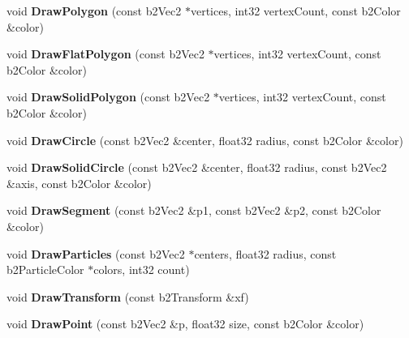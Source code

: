 \begin{DoxyCompactItemize}
\item 
\hypertarget{classDebugDraw_a14ab8cf80799e57df5414db216552962}{void {\bfseries Draw\-Polygon} (const b2\-Vec2 $\ast$vertices, int32 vertex\-Count, const b2\-Color \&color)}\label{classDebugDraw_a14ab8cf80799e57df5414db216552962}

\item 
\hypertarget{classDebugDraw_a8d576ff90e7d44b220b37c18c493e55c}{void {\bfseries Draw\-Flat\-Polygon} (const b2\-Vec2 $\ast$vertices, int32 vertex\-Count, const b2\-Color \&color)}\label{classDebugDraw_a8d576ff90e7d44b220b37c18c493e55c}

\item 
\hypertarget{classDebugDraw_a1562ce91df605efef3cdf300be267cc2}{void {\bfseries Draw\-Solid\-Polygon} (const b2\-Vec2 $\ast$vertices, int32 vertex\-Count, const b2\-Color \&color)}\label{classDebugDraw_a1562ce91df605efef3cdf300be267cc2}

\item 
\hypertarget{classDebugDraw_a5adb064981a67fefe7064820006b673e}{void {\bfseries Draw\-Circle} (const b2\-Vec2 \&center, float32 radius, const b2\-Color \&color)}\label{classDebugDraw_a5adb064981a67fefe7064820006b673e}

\item 
\hypertarget{classDebugDraw_a82428519034f36a01941dd19d6108bee}{void {\bfseries Draw\-Solid\-Circle} (const b2\-Vec2 \&center, float32 radius, const b2\-Vec2 \&axis, const b2\-Color \&color)}\label{classDebugDraw_a82428519034f36a01941dd19d6108bee}

\item 
\hypertarget{classDebugDraw_a69927caae41d26f23dea336a1269ee4e}{void {\bfseries Draw\-Segment} (const b2\-Vec2 \&p1, const b2\-Vec2 \&p2, const b2\-Color \&color)}\label{classDebugDraw_a69927caae41d26f23dea336a1269ee4e}

\item 
\hypertarget{classDebugDraw_a1a12644430a648a9a683eb41e7801d21}{void {\bfseries Draw\-Particles} (const b2\-Vec2 $\ast$centers, float32 radius, const b2\-Particle\-Color $\ast$colors, int32 count)}\label{classDebugDraw_a1a12644430a648a9a683eb41e7801d21}

\item 
\hypertarget{classDebugDraw_a6f61d333e6e76865ec4a6099ab31ae75}{void {\bfseries Draw\-Transform} (const b2\-Transform \&xf)}\label{classDebugDraw_a6f61d333e6e76865ec4a6099ab31ae75}

\item 
\hypertarget{classDebugDraw_a1f9c99b818e21078a53d11a5ca6e2c79}{void {\bfseries Draw\-Point} (const b2\-Vec2 \&p, float32 size, const b2\-Color \&color)}\label{classDebugDraw_a1f9c99b818e21078a53d11a5ca6e2c79}


\end{DoxyCompactItemize}
